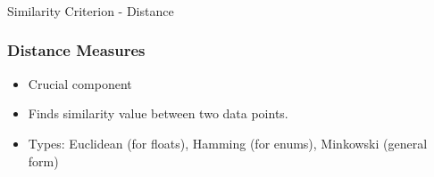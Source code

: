\begin{frame}[fragile]\frametitle{}
\begin{center}
{\Large Similarity Criterion - Distance}
\end{center}
\end{frame}


\begin{frame}[fragile]\frametitle{Distance Measures}
\begin{itemize}
\item Crucial component
\item Finds similarity value between two data points.
\item Types: Euclidean (for floats), Hamming (for enums), Minkowski (general form)
\end{itemize}
\end{frame}


